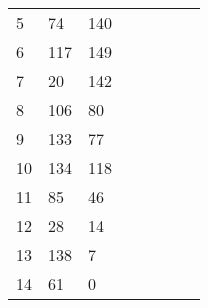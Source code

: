 \begin{table}[tb]
\begin{tabular}{|l|l|l|lllll}
	5  & 74  & 140 &                          &                         &                         &                          &                         \\ \cline{1-3}
	6  & 117 & 149 &                          &                         &                         &                          &                         \\ \cline{1-3}
	7  & 20  & 142 &                          &                         &                         &                          &                         \\ \cline{1-3}
	8  & 106 & 80  &                          &                         &                         &                          &                         \\ \cline{1-3}
	9  & 133 & 77  &                          &                         &                         &                          &                         \\ \cline{1-3}
	10 & 134 & 118 &                          &                         &                         &                          &                         \\ \cline{1-3}
	11 & 85  & 46  &                          &                         &                         &                          &                         \\ \cline{1-3}
	12 & 28  & 14  &                          &                         &                         &                          &                         \\ \cline{1-3}
	13 & 138 & 7   &                          &                         &                         &                          &                         \\ \cline{1-3}
	14 & 61  & 0   &                          &                         &                         &                          &                         \\ \cline{1-3}
\end{tabular}
	
	
\end{table}


